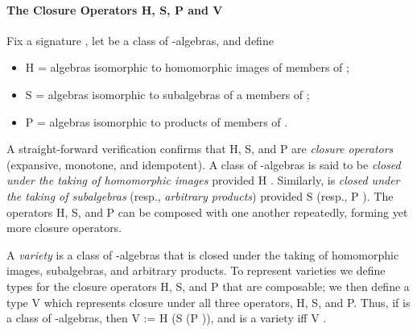 \begin{code}
%
\>[1]\AgdaSpace{}%
\AgdaSymbol{(}%
\>[20]\AgdaSymbol{\{}\AgdaSpace{}%
\AgdaSymbol{=}\AgdaSpace{}%
\AgdaSymbol{\}\{}\AgdaSymbol{\}\{}\AgdaSymbol{\}}%
\>[35]\AgdaSpace{}%
%
\>[44]\AgdaSymbol{)}\AgdaSpace{}%
\AgdaSymbol{=}\AgdaSpace{}%
%
\>[56]\AgdaSpace{}%
\AgdaSymbol{\{}\AgdaSpace{}%
\AgdaSymbol{=}\AgdaSpace{}%
\AgdaSymbol{\}\{}\AgdaSymbol{\}\{}\AgdaSymbol{\}}%
\>[84]\AgdaSymbol{(}\AgdaSpace{}%
\AgdaSymbol{)(}\AgdaSpace{}%
\AgdaSymbol{)}\<%
\end{code}
\fi

\paragraph*{The Closure Operators H, S, P and V}
Fix a signature , let  be a class of -algebras, and define
\begin{itemize}
\item \af H  = algebras isomorphic to homomorphic images of members of ;
\item \af S  = algebras isomorphic to subalgebras of a members of ;
\item \af P  = algebras isomorphic to products of members of .
\end{itemize}
A straight-forward verification confirms that \af H, \af S, and \af P are \emph{closure operators} (expansive, monotone, and idempotent).  A class  of -algebras is said to be \emph{closed under the taking of homomorphic images} provided \af H   . Similarly,  is \emph{closed under the taking of subalgebras} (resp., \emph{arbitrary products}) provided \af S    (resp., \af P   ). The operators \af H, \af S, and \af P can be composed with one another repeatedly, forming yet more closure operators.


A \emph{variety} is a class of -algebras that is closed under the taking of
homomorphic images, subalgebras, and arbitrary products.  To represent varieties
we define types for the closure operators \af H, \af S, and \af P that are composable; we
then define a type \af V which represents closure under all three operators, \af H, \af S,
and \af P. Thus, if  is a class of -algebras, then
\af V  := \af H (\af S (\af P )), and  is a variety iff \af V   .
\ifshort\else

